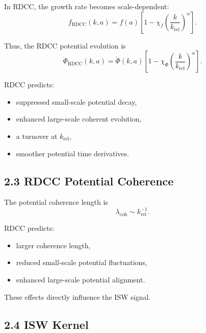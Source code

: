\documentclass[11pt,a4paper]{article}
\begin{document}
In RDCC, the growth rate becomes scale-dependent:
\begin{equation}
    f_{\mathrm{RDCC}}(k,a)
    = f(a)
      \left[
        1 - \chi_{f}
        \left(\frac{k}{k_{\mathrm{rel}}}\right)^{\alpha}
      \right].
\end{equation}

Thus, the RDCC potential evolution is
\begin{equation}
    \dot{\Phi}_{\mathrm{RDCC}}(k,a)
    = \dot{\Phi}(k,a)
      \left[
        1 - \chi_{\Phi}
        \left(\frac{k}{k_{\mathrm{rel}}}\right)^{\alpha}
      \right].
\end{equation}

RDCC predicts:

\begin{itemize}
    \item suppressed small-scale potential decay,
    \item enhanced large-scale coherent evolution,
    \item a turnover at $k_{\mathrm{rel}}$,
    \item smoother potential time derivatives.
\end{itemize}

\subsection*{2.3 RDCC Potential Coherence}

The potential coherence length is
\begin{equation}
    \lambda_{\mathrm{coh}}
    \sim k_{\mathrm{rel}}^{-1}.
\end{equation}

RDCC predicts:

\begin{itemize}
    \item larger coherence length,
    \item reduced small-scale potential fluctuations,
    \item enhanced large-scale potential alignment.
\end{itemize}

These effects directly influence the ISW signal.

\subsection*{2.4 ISW Kernel}
\end{document}
